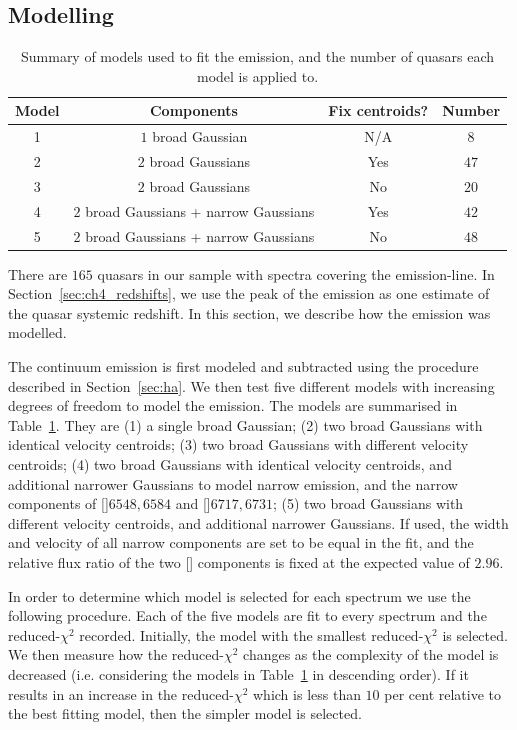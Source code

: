 \subsection{Modelling \hans}
\label{sec:hamodel}

\begin{table}
  \centering
  \footnotesize 
  \caption{Summary of models used to fit the \ha emission, and the number of quasars each model is applied to.}
  \label{tab:hamod}
    \begin{tabular}{cccc} 
    \hline
    Model     & Components & Fix centroids? & Number \\
    \hline
    1        & $1$ broad Gaussian  & N/A &  $8$ \\
    2        & $2$ broad Gaussians & Yes &  $47$ \\
    3        & $2$ broad Gaussians & No  &  $20$ \\
    4        & $2$ broad Gaussians + narrow Gaussians & Yes & $42$ \\
    5        & $2$ broad Gaussians + narrow Gaussians & No  & $48$ \\
    \hline
    \end{tabular}
\end{table} 

There are $165$ quasars in our sample with spectra covering the \ha emission-line. 
In Section~\ref{sec:ch4_redshifts}, we use the peak of the \ha emission as one estimate of the quasar systemic redshift. 
In this section, we describe how the \ha emission was modelled. 

The continuum emission is first modeled and subtracted using the procedure described in Section~\ref{sec:ha}. 
We then test five different models with increasing degrees of freedom to model the \ha emission. 
The models are summarised in Table~\ref{tab:hamod}. 
They are (1) a single broad Gaussian; (2) two broad Gaussians with identical velocity centroids; (3) two broad Gaussians with different velocity centroids; (4) two broad Gaussians with identical velocity centroids, and additional narrower Gaussians to model narrow \ha emission, and the narrow components of []\ll$6548,6584$ and []\ll$6717,6731$; (5) two broad Gaussians with different velocity centroids, and additional narrower Gaussians. 
If used, the width and velocity of all narrow components are set to be equal in the fit, and the relative flux ratio of the two [] components is fixed at the expected value of $2.96$.

In order to determine which model is selected for each spectrum we use the following procedure.  
Each of the five models are fit to every spectrum and the reduced-$\chi^2$ recorded.
Initially, the model with the smallest reduced-$\chi^2$ is selected. 
We then measure how the reduced-$\chi^2$ changes as the complexity of the model is decreased (i.e. considering the models in Table~\ref{tab:hamod} in descending order). 
If it results in an increase in the reduced-$\chi^2$ which is less than $10$ per cent relative to the best fitting model, then the simpler model is selected.  

